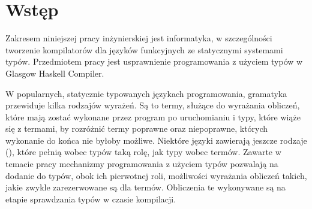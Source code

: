 \chapter{Wstęp}\label{chap:wstep}

Zakresem niniejszej pracy inżynierskiej jest informatyka, w szczególności
tworzenie kompilatorów dla języków funkcyjnych ze statycznymi systemami typów.
Przedmiotem pracy jest usprawnienie
programowania z użyciem typów w Glasgow Haskell Compiler.

W popularnych, statycznie typowanych językach programowania, gramatyka przewiduje
kilka rodzajów wyrażeń. Są to termy, służące do wyrażania obliczeń, które mają zostać
wykonane przez program po uruchomianiu i typy, które wiąże się z termami, by
rozróżnić termy poprawne oraz niepoprawne, których wykonanie do końca nie byłoby możliwe.
Niektóre języki  zawierają jeszcze rodzaje (), które pełnią wobec
typów taką rolę, jak typy wobec termów. Zawarte w temacie pracy mechanizmy programowania
z użyciem typów pozwalają na dodanie do typów, obok ich pierwotnej roli, możliwości
wyrażania obliczeń takich, jakie zwykle zarezerwowane są dla termów.
Obliczenia te wykonywane są na etapie sprawdzania typów w czasie kompilacji.


